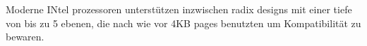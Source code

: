 Moderne INtel prozessoren unterstützen inzwischen radix designs mit einer tiefe von bis zu 5 ebenen,
die nach wie vor 4KB pages benutzten um Kompatibilität zu bewaren.






